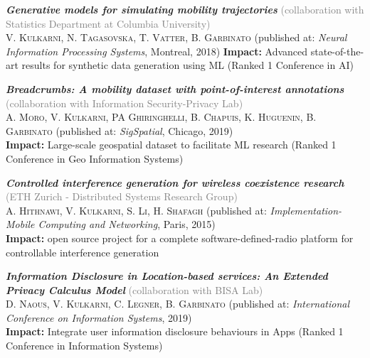 
\begin{itemize}[leftmargin=*]

    \small{

    \item \textbf{\textit{Generative models for simulating mobility trajectories}} \textcolor{gray}{(collaboration with Statistics Department at Columbia University)}\\
    \textsc{V. Kulkarni, N. Tagasovska, T. Vatter, B. Garbinato} (published at: \textit{Neural Information Processing Systems}, Montreal, 2018)
    \textbf{Impact:} Advanced state-of-the-art results for synthetic data generation using ML (Ranked 1 Conference in AI) 
    
    
    \item \textbf{\textit{Breadcrumbs: A mobility dataset with point-of-interest annotations}} \textcolor{gray}{(collaboration with Information Security-Privacy  Lab)}\\
    \textsc{A. Moro, V. Kulkarni, PA Ghiringhelli, B. Chapuis, K. Huguenin, B. Garbinato} (published at: \textit{SigSpatial}, Chicago, 2019)\\
    \textbf{Impact:} Large-scale geospatial dataset to facilitate ML research (Ranked 1 Conference in Geo Information Systems)
   
   
    \item \textbf{\textit{Controlled interference generation for wireless coexistence research}} \textcolor{gray}{(ETH Zurich - Distributed Systems Research Group)}\\
    \textsc{A. Hithnawi, V. Kulkarni, S. Li, H. Shafagh} (published at: \textit{Implementation-Mobile Computing and Networking}, Paris, 2015)\\
    \textbf{Impact:} open source project for a complete software-defined-radio platform for controllable interference generation   
    

    \item \textbf{\textit{Information Disclosure in Location-based services: An Extended Privacy Calculus Model}} \textcolor{gray}{(collaboration with BISA Lab)}\\
    \textsc{D. Naous, V. Kulkarni, C. Legner, B. Garbinato} (published at: \textit{International Conference on Information Systems}, 2019)\\
    \textbf{Impact:} Integrate user information disclosure behaviours in Apps (Ranked 1 Conference in Information Systems)
    
}
\end{itemize}
